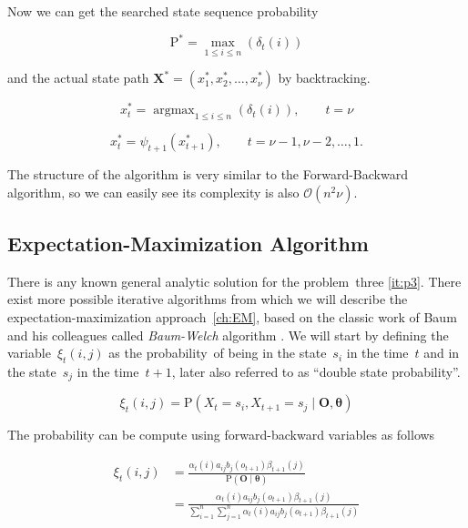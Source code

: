 \documentclass[thesis=M,english]{FITthesis}[2012/10/20]
\newcommand{\matr}[1]{\mathbf{#1}}
\newcommand{\argmax}{\mathop{\mathrm{argmax}}}
\begin{document}
Now we can get the searched state sequence probability 

\begin{equation}
\mathrm{P}^* = \max_{1 \leq i \leq n} ( \delta_{t}(i) )  
\end{equation}

and the actual state path $\matr{X}^* = ( x_1^*, x_2^*, \dots, x_{\nu}^*)$ by backtracking.

\begin{equation}
x_t^* = \argmax_{1 \leq i \leq n} ( \delta_{t}(i) ),  \qquad t = \nu 
\end{equation}

\begin{equation}
x_t^* = \psi_{t+1}(x_{t+1}^*), \qquad t = \nu-1, \nu-2, \dots, 1.  
\end{equation}

The structure of the algorithm is very similar to the Forward-Backward algorithm, so we can easily see its complexity is also $\mathcal{O}(n^2\nu)$.

\subsection{Expectation-Maximization Algorithm}\label{sec:BWA}

There is any known general analytic solution for the problem~three \ref{it:p3}. There exist more possible iterative algorithms from which we will describe the expectation-maximization approach~\ref{ch:EM}, based on the classic work of Baum and his colleagues called \textit{Baum-Welch} algorithm \cite{Ba70}. We will start by defining the variable~$\xi_t(i,j)$ as the probability~of being in the state~$s_i$ in the time~$t$ and in the state~$s_j$ in the time~$t+1$, later also referred to as ``double state probability''. 

\begin{equation}
\xi_t(i,j) = \mathrm{P}( X_t = s_i, X_{t+1} = s_j \mid \matr{O}, \boldsymbol{\theta} )  
\end{equation}

The probability can be compute using forward-backward variables as follows
 
\begin{equation}\label{eq:xi}
\begin{aligned}
\xi_t(i,j) &= \frac{ \alpha_t(i) a_{ij} b_j(o_{t+1}) \beta_{t+1}(j) }
		   		   { \mathrm{P}( \matr{O} \mid \boldsymbol{\theta} ) } \\
		   &= \frac{ \alpha_t(i) a_{ij} b_j(o_{t+1}) \beta_{t+1}(j) }
		   		   { \sum\limits_{i=1}^n \sum\limits_{j=1}^n \alpha_t(i) a_{ij} b_j(o_{t+1}) \beta_{t+1}(j) }
\end{aligned}
\end{equation}
\end{document}
